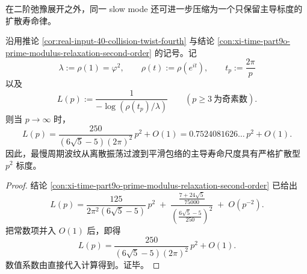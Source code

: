 在二阶弛豫展开之外，同一 slow mode 还可进一步压缩为一个只保留主导标度的扩散寿命律。

\begin{theorem}[周期波纹的扩散寿命律]\label{thm:xi-time-part9o-periodic-ripple-diffusive-lifetime}
沿用推论 \ref{cor:real-input-40-collision-twist-fourth} 与结论
\ref{con:xi-time-part9o-prime-modulus-relaxation-second-order} 的记号。记
\[
\lambda:=\rho(1)=\varphi^2,
\qquad
\rho(t):=\rho(e^{it}),
\qquad
t_p:=\frac{2\pi}{p}
\]
以及
\[
L(p):=\frac{1}{-\log(\rho(t_p)/\lambda)}
\qquad
(p\ge 3\ \text{为奇素数}).
\]
则当 \(p\to\infty\) 时，
\[
L(p)
=
\frac{250}{(6\sqrt5-5)(2\pi)^2}\,p^2+O(1)
=
0.7524081626\ldots\,p^2+O(1).
\]
因此，最慢周期波纹从离散振荡过渡到平滑包络的主导寿命尺度具有严格扩散型 \(p^2\) 标度。
\end{theorem}
\begin{proof}
结论 \ref{con:xi-time-part9o-prime-modulus-relaxation-second-order} 已给出
\[
L(p)
=
\frac{125}{2\pi^2(6\sqrt5-5)}\,p^2
\;+\;
\frac{\frac{7+24\sqrt5}{75000}}
{\left(\frac{6\sqrt5-5}{250}\right)^2}
\;+\;
O(p^{-2}).
\]
把常数项并入 \(O(1)\) 后，即得
\[
L(p)=\frac{250}{(6\sqrt5-5)(2\pi)^2}\,p^2+O(1).
\]
数值系数由直接代入计算得到。证毕。
\end{proof}



\endinput
